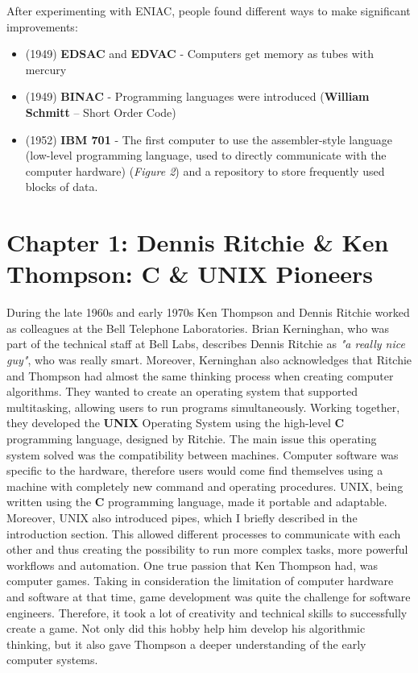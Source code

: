 \documentclass[12pt]{article}
\begin{document}
\noindent After experimenting with ENIAC, people found different ways to make significant improvements:
\begin{itemize}
    \item (1949) \textbf{EDSAC} and \textbf{EDVAC} - Computers get memory as tubes with mercury
    \item (1949) \textbf{BINAC} - Programming languages were introduced (\textbf{William Schmitt} – Short Order Code)
    \item (1952) \textbf{IBM 701} - The first computer to use the assembler-style language (low-level programming language, used to directly communicate with the computer hardware) (\textit{Figure 2}) and a repository to store frequently used blocks of data.\newline\newline
\end{itemize}

\section{Chapter 1: Dennis Ritchie \& Ken Thompson: C \& UNIX Pioneers}
During the late 1960s and early 1970s Ken Thompson and Dennis Ritchie worked as colleagues at the Bell Telephone Laboratories. Brian Kerninghan, who was part of the technical
staff at Bell Labs, describes Dennis Ritchie as \textit{"a really nice
    guy"}, who was really smart. Moreover, Kerninghan also acknowledges that Ritchie and Thompson had almost the same thinking process when creating computer algorithms.
They wanted to create an operating system that supported multitasking, allowing users to run programs simultaneously. \newline\newline
Working together, they developed the \textbf{UNIX} Operating System using the high-level \textbf{C} programming language, designed by Ritchie.
The main issue this operating system solved was the compatibility between machines.
Computer software was specific to the hardware, therefore users would come find themselves using a machine with completely new command and operating procedures.
UNIX, being written using the \textbf{C} programming language, made it portable and adaptable. Moreover, UNIX also introduced pipes, which I briefly described in the introduction section.
This allowed different processes to communicate with each other and thus creating the possibility to run more complex tasks, more powerful workflows and automation. \newline\newline
One true passion that Ken Thompson had, was computer games. Taking in consideration the limitation of computer hardware and software at that time, game development was quite the challenge for software engineers.
Therefore, it took a lot of creativity and technical skills to successfully create a game. Not only did this hobby help him develop his algorithmic thinking, but it also gave Thompson a deeper understanding of the early
computer systems.\newline
\end{document}
